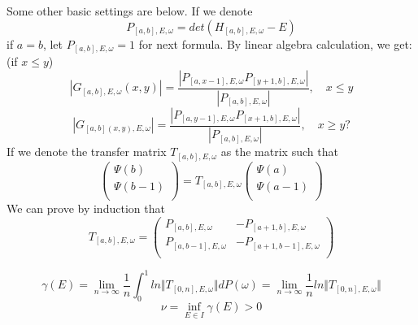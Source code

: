 Some other basic settings are below. If we denote
\[
  P_{[a,b],E,\omega}=det(H_{[a,b],E,\omega}-E)
\]
if $a=b$, let $  P_{[a,b],E,\omega}=1$ for next formula.
By linear algebra calculation, we get:(if $x\leq y$)
\begin{equation}\label{A}
  \left\vert G_{[a,b],E,\omega}(x,y)\right\vert=\frac{\left\vert P_{[a,x-1],E,\omega}P_{[y+1,b],E,\omega}\right\vert}{\left\vert P_{[a,b],E,\omega}\right\vert},\quad x\leq y
\end{equation}
  \[
  \left\vert G_{[a,b](x,y),E,\omega}\right\vert=\frac{\left\vert P_{[a,y-1],E,\omega}P_{[x+1,b],E,\omega}\right\vert}{\left\vert P_{[a,b],E,\omega}\right\vert},\quad x\geq y?
\]
If we denote the transfer matrix $T_{[a,b],E,\omega}$ as the matrix such that
\[
\left(
\begin{array}{c}
  \Psi(b)\\
  \Psi(b-1)\\
\end{array}
\right)
=T_{[a,b],E,\omega} \left(
\begin{array}{c}
  \Psi(a)\\
  \Psi(a-1)\\
\end{array}
\right)
\]
We can prove by induction that
\[
T_{[a,b],E,\omega}=\left(
  \begin{array}{cc}
    P_{[a,b],E,\omega} & -P_{[a+1,b],E,\omega}\\
    P_{[a,b-1],E,\omega} & -P_{[a+1,b-1],E,\omega}\\
  \end{array}
  \right)
\]
\begin{definition}\label{LE}
  \[
    \gamma(E)=\lim_{n\to\infty}\frac{1}{n}\int_0^1 ln\Vert T_{[0,n],E,\omega}\Vert dP(\omega)=\lim_{n\rightarrow\infty}\frac{1}{n} ln\Vert T_{[0,n],E,\omega}\Vert
  \]
  \[\nu=\inf\limits_{E\in I}\gamma(E)>0\]
\end{definition}


